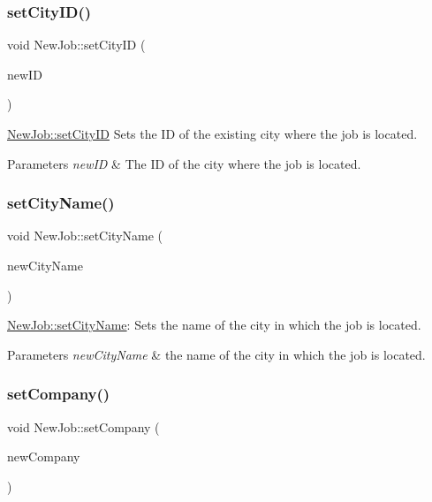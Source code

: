 \subsubsection{\texorpdfstring{set\+City\+I\+D()}{setCityID()}}
{\footnotesize\ttfamily void New\+Job\+::set\+City\+ID (\begin{DoxyParamCaption}\item[{int}]{new\+ID }\end{DoxyParamCaption})}



\mbox{\hyperlink{class_new_job_ab5b021c928c289b77b726cc418d194de}{New\+Job\+::set\+City\+ID}} Sets the ID of the existing city where the job is located. 


\begin{DoxyParams}{Parameters}
{\em new\+ID} & The ID of the city where the job is located. \\
\hline
\end{DoxyParams}
\mbox{\label{class_new_job_a66004f3c78c6d9796fc3c5ce66f2479b}} 
\subsubsection{\texorpdfstring{set\+City\+Name()}{setCityName()}}
{\footnotesize\ttfamily void New\+Job\+::set\+City\+Name (\begin{DoxyParamCaption}\item[{Q\+String}]{new\+City\+Name }\end{DoxyParamCaption})}



\mbox{\hyperlink{class_new_job_a66004f3c78c6d9796fc3c5ce66f2479b}{New\+Job\+::set\+City\+Name}}\+: Sets the name of the city in which the job is located. 


\begin{DoxyParams}{Parameters}
{\em new\+City\+Name} & the name of the city in which the job is located. \\
\hline
\end{DoxyParams}
\mbox{\label{class_new_job_ad9f522f4a6a45348ecc3ab1229b5eabb}} 
\subsubsection{\texorpdfstring{set\+Company()}{setCompany()}}
{\footnotesize\ttfamily void New\+Job\+::set\+Company (\begin{DoxyParamCaption}\item[{Q\+String}]{new\+Company }\end{DoxyParamCaption})}



